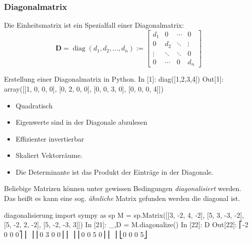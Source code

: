 
\subsubsection{Diagonalmatrix}
Die Einheitsmatrix ist ein Spezialfall einer Diagonalmatrix:
 $$ \mathbf{D}=\operatorname {diag} (d_{1},d_{2},\dotsc ,d_{n}):={\begin{bmatrix}d_{1}&0&\cdots &0\\0&d_{2}&\ddots &\vdots \\\vdots &\ddots &\ddots &0\\0&\cdots &0&d_{n}\end{bmatrix}} $$


\begin{python}{Erstellung einer Diagonalmatrix in Python.}
In [1]: diag([1,2,3,4])
Out[1]:
array([[1, 0, 0, 0],
       [0, 2, 0, 0],
       [0, 0, 3, 0],
       [0, 0, 0, 4]])
\end{python}

\begin{itemize}
   \item Quadratisch
   \item Eigenwerte sind in der Diagonale abzulesen
   \item Effizienter invertierbar
   \item Skaliert Vektorräume.
   \item Die Determinante ist das Produkt der Einträge in der Diagonale.
\end{itemize}




Beliebige Matrizen können unter gewissen Bedingungen \emph{diagonalisiert} werden. Das heißt es kann eine sog. \emph{ähnliche} Matrix gefunden werden die diagonal ist.
\begin{python}{diagonalisierung}
import sympy as sp  
M = sp.Matrix([[3, -2,  4, -2], 
               [5,  3, -3, -2], 
               [5, -2,  2, -2], 
               [5, -2, -3,  3]]) 
In [21]: _,D = M.diagonalize()
In [22]: D
Out[22]:
⎡-2  0  0  0⎤
⎢           ⎥
⎢0   3  0  0⎥
⎢           ⎥
⎢0   0  5  0⎥
⎢           ⎥
⎣0   0  0  5⎦
\end{python}

